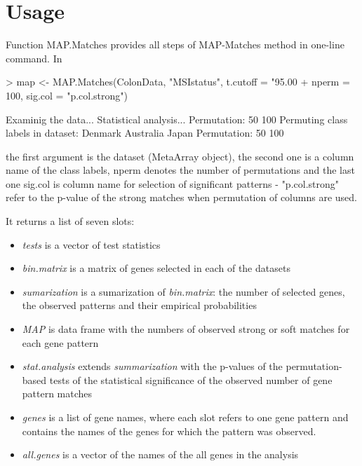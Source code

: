 \documentclass[a4paper]{report}
\begin{document}
\section*{Usage}
Function {\ttfamily MAP.Matches} provides all steps of MAP-Matches method in one-line command. In
\begin{Schunk}
\begin{Sinput}
> map <- MAP.Matches(ColonData, "MSIstatus", t.cutoff = "95.00%
+ nperm = 100, sig.col = "p.col.strong")
\end{Sinput}
\begin{Soutput}
Examinig the data...
Statistical analysis...
Permutation: 
50 
100 
Permuting class labels in dataset: 
Denmark 
Australia 
Japan 
Permutation: 
50 
100 
\end{Soutput}
\end{Schunk}
the first argument is the dataset (MetaArray object), the second one is a column name of the class labels, {\ttfamily nperm} denotes the number of permutations and the last one {\ttfamily sig.col} is column name for selection of significant patterns - {\ttfamily "p.col.strong"} refer to the p-value of the strong matches when permutation of columns are used.

It returns a list of seven slots:
\begin{itemize}
\item \emph{tests} is a vector of test statistics
\item \emph{bin.matrix} is a matrix of genes selected in each of the datasets
\item \emph{sumarization} is a sumarization of \emph{bin.matrix}: the number of selected genes, the observed patterns and their empirical probabilities
\item \emph{MAP} is data frame with the numbers of observed strong or soft matches for each gene pattern
\item \emph{stat.analysis} extends \emph{summarization} with the p-values of the permutation-based tests of the statistical significance of the observed number of gene pattern matches
\item \emph{genes} is a list of gene names, where each slot refers to one gene pattern and contains the names of the genes for which the pattern was observed.
\item \emph{all.genes} is a vector of the names of the all genes in the analysis
\end{itemize}
\end{document}
